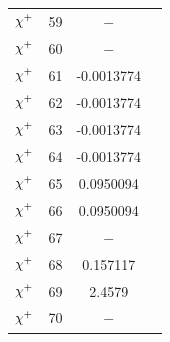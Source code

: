 \documentclass[11pt]{article}
\newcommand{\mychibig}{\raisebox{0pt}[1ex][1ex]{$\chi$}}
\begin{document}
\begin{table}[h!]
\begin{tabular}{c c c c}
$\mychibig^+$ & 59 & $-$ \\ 
$\mychibig^+$ & 60 & $-$ \\ 
$\mychibig^+$ & 61 & -0.0013774 \\ 
$\mychibig^+$ & 62 & -0.0013774 \\ 
$\mychibig^+$ & 63 & -0.0013774 \\ 
$\mychibig^+$ & 64 & -0.0013774 \\ 
$\mychibig^+$ & 65 & 0.0950094 \\ 
$\mychibig^+$ & 66 & 0.0950094 \\ 
$\mychibig^+$ & 67 & $-$ \\ 
$\mychibig^+$ & 68 & 0.157117 \\ 
$\mychibig^+$ & 69 & 2.4579 \\ 
$\mychibig^+$ & 70 & $-$ \\ 
\hline\end{tabular}
\end{table}
\end{document}
